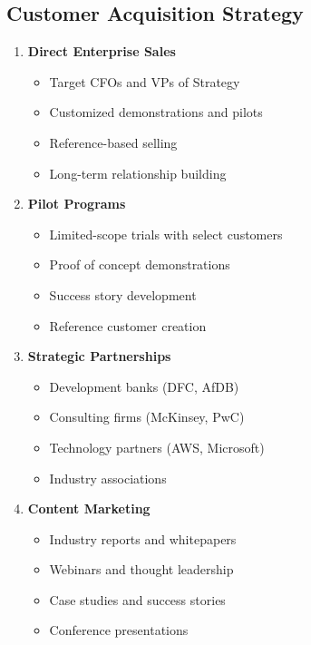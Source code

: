 \documentclass[business]{../templates/infraradar-main}
\begin{document}
\subsection{Customer Acquisition Strategy}
\begin{enumerate}
    \item \textbf{Direct Enterprise Sales}
    \begin{itemize}
        \item Target CFOs and VPs of Strategy
        \item Customized demonstrations and pilots
        \item Reference-based selling
        \item Long-term relationship building
    \end{itemize}
    
    \item \textbf{Pilot Programs}
    \begin{itemize}
        \item Limited-scope trials with select customers
        \item Proof of concept demonstrations
        \item Success story development
        \item Reference customer creation
    \end{itemize}
    
    \item \textbf{Strategic Partnerships}
    \begin{itemize}
        \item Development banks (DFC, AfDB)
        \item Consulting firms (McKinsey, PwC)
        \item Technology partners (AWS, Microsoft)
        \item Industry associations
    \end{itemize}
    
    \item \textbf{Content Marketing}
    \begin{itemize}
        \item Industry reports and whitepapers
        \item Webinars and thought leadership
        \item Case studies and success stories
        \item Conference presentations
    \end{itemize}
\end{enumerate}
\end{document}

